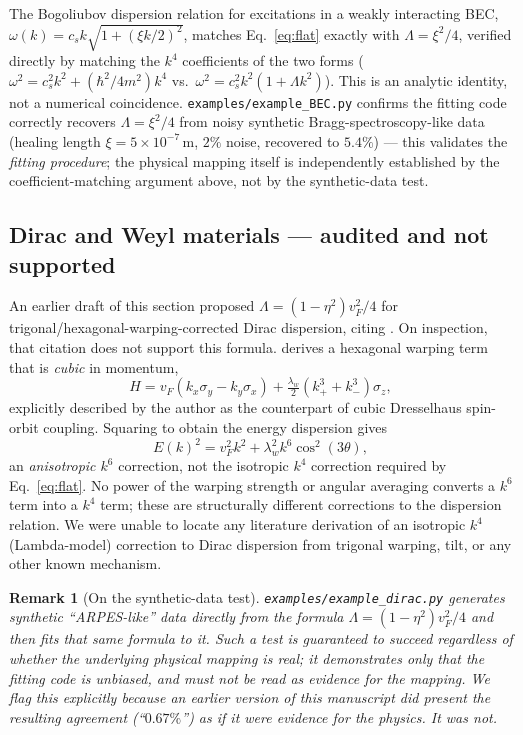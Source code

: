 \documentclass[12pt,a4paper]{article}
\newtheorem{remark}{Remark}
\begin{document}
The Bogoliubov dispersion relation for excitations in a weakly
interacting BEC, $\omega(k)=c_sk\sqrt{1+(\xi k/2)^2}$, matches
Eq.~\eqref{eq:flat} exactly with $\Lambda=\xi^2/4$, verified directly by
matching the $k^4$ coefficients of the two forms
($\omega^2=c_s^2k^2+(\hbar^2/4m^2)k^4$ vs.\ $\omega^2=c_s^2k^2(1+\Lambda
k^2)$). This is an analytic identity, not a numerical coincidence.
\texttt{examples/example\_BEC.py} confirms the fitting code correctly
recovers $\Lambda=\xi^2/4$ from noisy synthetic Bragg-spectroscopy-like
data (healing length $\xi=5\times10^{-7}$\,m, $2\%$ noise, recovered to
$5.4\%$) --- this validates the \emph{fitting procedure}; the physical
mapping itself is independently established by the coefficient-matching
argument above, not by the synthetic-data test.

\subsection{Dirac and Weyl materials --- audited and not supported}
\label{sec:dirac_audit}

An earlier draft of this section proposed $\Lambda=(1-\eta^2)v_F^2/4$
for trigonal/hexagonal-warping-corrected Dirac dispersion, citing
\citet{Fu2009}. On inspection, that citation does not support this
formula. \citet{Fu2009} derives a hexagonal warping term that is
\emph{cubic} in momentum,
\begin{equation}
  H = v_F(k_x\sigma_y - k_y\sigma_x) + \tfrac{\lambda_w}{2}(k_+^3+k_-^3)\sigma_z,
\end{equation}
explicitly described by the author as the counterpart of cubic
Dresselhaus spin-orbit coupling. Squaring to obtain the energy
dispersion gives
\begin{equation}
  E(k)^2 = v_F^2k^2 + \lambda_w^2k^6\cos^2(3\theta),
\end{equation}
an \emph{anisotropic $k^6$} correction, not the isotropic $k^4$
correction required by Eq.~\eqref{eq:flat}. No power of the warping
strength or angular averaging converts a $k^6$ term into a $k^4$ term;
these are structurally different corrections to the dispersion relation.
We were unable to locate any literature derivation of an isotropic
$k^4$ (Lambda-model) correction to Dirac dispersion from trigonal
warping, tilt, or any other known mechanism.

\begin{remark}[On the synthetic-data test]
\texttt{examples/example\_dirac.py} generates synthetic ``ARPES-like''
data directly from the formula $\Lambda=(1-\eta^2)v_F^2/4$ and then
fits that same formula to it. Such a test is guaranteed to succeed
regardless of whether the underlying physical mapping is real; it
demonstrates only that the fitting code is unbiased, and must not be
read as evidence for the mapping. We flag this explicitly because an
earlier version of this manuscript did present the resulting agreement
(``$0.67\%$'') as if it were evidence for the physics. It was not.
\end{remark}
\end{document}
